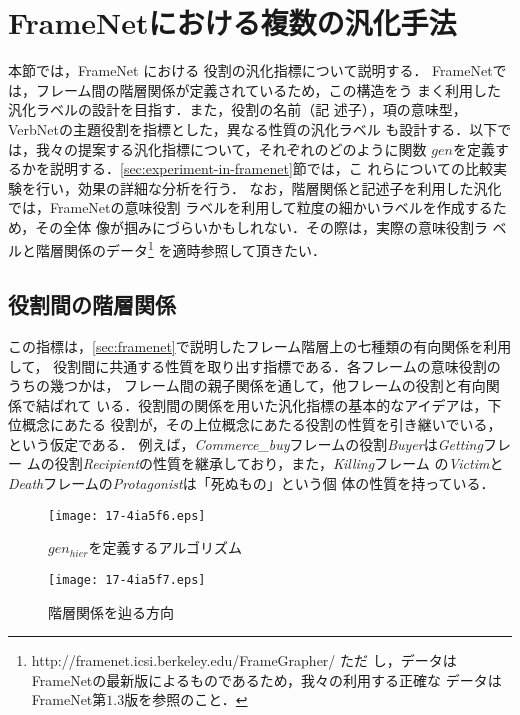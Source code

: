\documentclass[japanese]{jnlp_1.4}
\begin{document}
\section{FrameNetにおける複数の汎化手法}
\label{sec:generalization-criteria-framenet}

本節では，FrameNet
における
役割の汎化指標について説明する．
FrameNetでは，フレーム間の階層関係が定義されているため，この構造をう
まく利用した汎化ラベルの設計を目指す．また，役割の名前（記
述子），項の意味型，VerbNetの主題役割を指標とした，異なる性質の汎化ラベル
も設計する．以下では，我々の提案する汎化指標について，それぞれのどのように関数
$gen$を定義するかを説明する．\ref{sec:experiment-in-framenet}節では，こ
れらについての比較実験を行い，効果の詳細な分析を行う．
なお，階層関係と記述子を利用した汎化では，FrameNetの意味役割
ラベルを利用して粒度の細かいラベルを作成するため，その全体
像が掴みにづらいかもしれない．その際は，実際の意味役割ラ
ベルと階層関係のデータ\footnote{http://framenet.icsi.berkeley.edu/FrameGrapher/  ただ
し，データはFrameNetの最新版によるものであるため，我々の利用する正確な
データはFrameNet第$1.3$版を参照のこと．}
を適時参照して頂きたい．


\subsection{役割間の階層関係}

この指標は，\ref{sec:framenet}で説明したフレーム階層上の七種類の有向関係を利用して，
役割間に共通する性質を取り出す指標である．各フレームの意味役割のうちの幾つかは，
フレーム間の親子関係を通して，他フレームの役割と有向関係で結ばれて
いる．役割間の関係を用いた汎化指標の基本的なアイデアは，下位概念にあたる
役割が，その上位概念にあたる役割の性質を引き継いでいる，という仮定である．
例えば，{\it Commerce\_buy}フレームの役割{\it Buyer}は{\it Getting}フレー
ムの役割{\it Recipient}の性質を継承しており，また，{\it Killing}フレーム
の{\it Victim}と{\it Death}フレームの{\it Protagonist}は「死ぬもの」という個
体の性質を持っている．

\begin{figure}[t]
\begin{minipage}{242pt}
\begin{center}
\texttt{[image: 17-4ia5f6.eps]}
\end{center}
\caption{$gen_{hier}$を定義するアルゴリズム}
\label{fig:hier-algorithm}
\end{minipage}
\hfill
\begin{minipage}{170pt}
\begin{center}
\texttt{[image: 17-4ia5f7.eps]}
\end{center}
\caption{階層関係を辿る方向}
\label{fig:hier-figure}
\end{minipage}
\end{figure}
\end{document}
